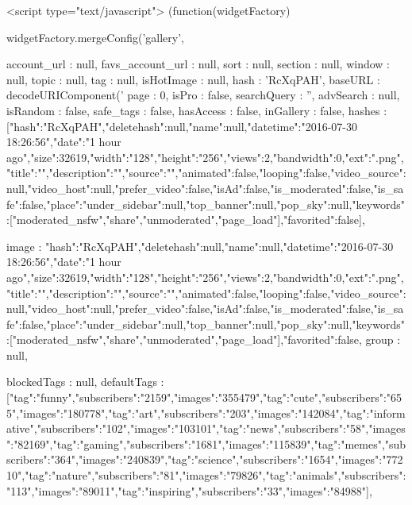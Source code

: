 {{        <script type="text/javascript">
    (function(widgetFactory) {
        widgetFactory.mergeConfig('gallery', {
            account_url         : null,
            favs_account_url    : null,
            sort                : null,
            section             : null,
            window              : null,
            topic               : null,
            tag                 : null,
            isHotImage          : null,
            hash                : 'RcXqPAH',
            baseURL             : decodeURIComponent('%
            page                : 0,
            isPro               : false,
            searchQuery         : '',
            advSearch           : null,
            isRandom            : false,
            safe_tags           : false,
            hasAccess           : false,
            inGallery           : false,
            hashes              : [{"hash":"RcXqPAH","deletehash":null,"name":null,"datetime":"2016-07-30 18:26:56","date":"1 hour ago","size":32619,"width":"128","height":"256","views":2,"bandwidth":0,"ext":".png","title":"","description":"","source":"","animated":false,"looping":false,"video_source":null,"video_host":null,"prefer_video":false,"isAd":false,"is_moderated":false,"is_safe":false,"place":{"under_sidebar":null,"top_banner":null,"pop_sky":null,"keywords":["moderated_nsfw","share","unmoderated","page_load"]},"favorited":false}],
        
            image               : {"hash":"RcXqPAH","deletehash":null,"name":null,"datetime":"2016-07-30 18:26:56","date":"1 hour ago","size":32619,"width":"128","height":"256","views":2,"bandwidth":0,"ext":".png","title":"","description":"","source":"","animated":false,"looping":false,"video_source":null,"video_host":null,"prefer_video":false,"isAd":false,"is_moderated":false,"is_safe":false,"place":{"under_sidebar":null,"top_banner":null,"pop_sky":null,"keywords":["moderated_nsfw","share","unmoderated","page_load"]},"favorited":false},
            group               : null,
        
            blockedTags         : null,
                    defaultTags         : [{"tag":"funny","subscribers":"2159","images":"355479"},{"tag":"cute","subscribers":"655","images":"180778"},{"tag":"art","subscribers":"203","images":"142084"},{"tag":"informative","subscribers":"102","images":"103101"},{"tag":"news","subscribers":"58","images":"82169"},{"tag":"gaming","subscribers":"1681","images":"115839"},{"tag":"memes","subscribers":"364","images":"240839"},{"tag":"science","subscribers":"1654","images":"77210"},{"tag":"nature","subscribers":"81","images":"79826"},{"tag":"animals","subscribers":"113","images":"89011"},{"tag":"inspiring","subscribers":"33","images":"84988"}],
        
}}}}
